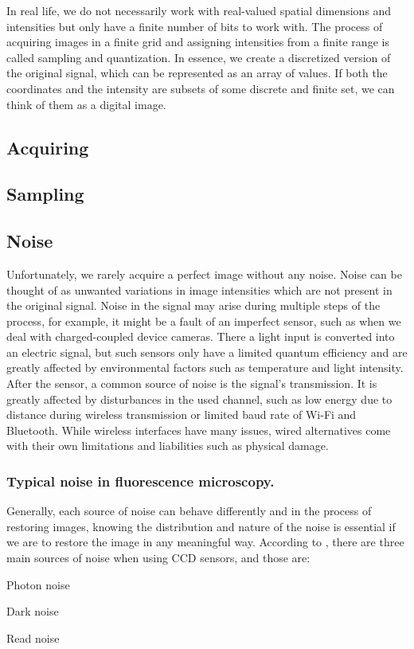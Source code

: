 \documentclass[
  digital,     %
  oneside,     %
  nosansbold,  %
  nocolorbold, %
  lof,         %
  lot,         %
]{fithesis4}
\begin{document}
In real life, we do not necessarily work with real-valued spatial dimensions and
intensities but only have a finite number of bits to work with. The process of
acquiring images in a finite grid and assigning intensities from a finite
range is called sampling and quantization. In essence, we create a discretized
version of the original signal, which can be represented as an array of values.
If both the coordinates and the intensity are subsets of some discrete and finite set,
we can think of them as a digital image.

\subsection{Acquiring}

\subsection{Sampling}

\subsection{Noise}

Unfortunately, we rarely acquire a perfect image without any noise. Noise
can be thought of as unwanted variations in image intensities which are not
present in the original signal. Noise in the signal may arise during multiple
steps of the process, for example, it might be a fault of an imperfect sensor,
such as when we deal with charged-coupled device cameras. There a light input is
converted into an electric signal, but such sensors only have a limited quantum
efficiency and are greatly affected by environmental factors such as 
temperature and light intensity. After the sensor, a common source of noise is
the signal's transmission. It is greatly affected by disturbances in the used
channel, such as low energy due to distance during wireless transmission or
limited baud rate of Wi-Fi and Bluetooth. While wireless interfaces have many
issues, wired alternatives come with their own limitations and liabilities such as physical damage.

\subsubsection{Typical noise in fluorescence microscopy.}

Generally, each source of noise can behave differently and in the process of restoring
images, knowing the distribution and nature of the noise is essential if we are to restore the 
image in any meaningful way. According to \parencite{hamamatsu_ccd}, there are three main sources of noise when using CCD sensors, and those are:
\begin{compactenum}
\item Photon noise
\item Dark noise
\item Read noise
\end{compactenum}
\end{document}
